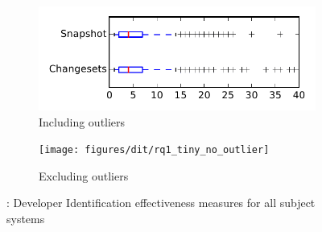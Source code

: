 
\begin{figure}
    \centering
    \begin{subfigure}{.4\textwidth}
        \centering
        \includegraphics[height=0.4\textheight]{figures/dit/rq1_tiny}
        \caption{Including outliers}\label{fig:dit:rq1:tiny_outlier}
    \end{subfigure}%
    \begin{subfigure}{.4\textwidth}
        \centering
        \texttt{[image: figures/dit/rq1\_tiny\_no\_outlier]}
        \caption{Excluding outliers}\label{fig:dit:rq1:tiny_no_outlier}
    \end{subfigure}
\caption{\done: Developer Identification effectiveness measures for all subject systems}
\label{fig:dit:rq1:tiny}
\end{figure}
